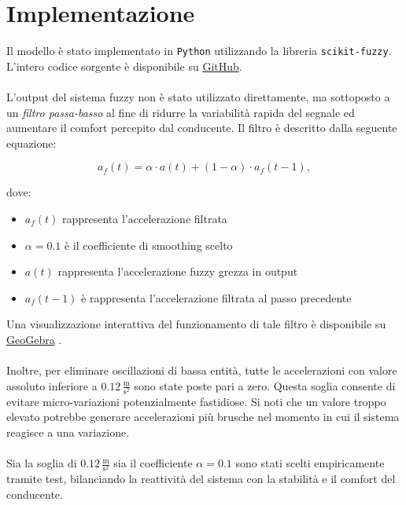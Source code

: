 \chapter{Implementazione}
\label{cha:implementazione}

Il modello è stato implementato in \texttt{Python} utilizzando la libreria \texttt{scikit-fuzzy}.  
L'intero codice sorgente è disponibile su \href{https://github.com/Leso246/FuzzyACC}{GitHub}.
\\\\
\noindent L'output del sistema fuzzy non è stato utilizzato direttamente, ma sottoposto a un \emph{filtro passa-basso} 
al fine di ridurre la variabilità rapida del segnale ed aumentare il comfort percepito dal conducente.  
Il filtro è descritto dalla seguente equazione:

\[
a_{f}(t) = \alpha \cdot a(t) + (1 - \alpha) \cdot a_{f}(t-1),
\]

\noindent dove:
\begin{itemize}
    \item $a_{f}(t)$ rappresenta l'accelerazione filtrata
    \item $\alpha = 0.1$ è il coefficiente di smoothing scelto
    \item $a(t)$ rappresenta l'accelerazione fuzzy grezza in output
    \item $a_{f}(t-1)$ è rappresenta l'accelerazione filtrata al passo precedente
\end{itemize}
Una visualizzazione interattiva del funzionamento di tale filtro è disponibile 
su \href{https://www.geogebra.org/m/tb88mqrm}{GeoGebra} \cite{geogebraEWMA}.
\\\\
\noindent Inoltre, per eliminare oscillazioni di bassa entità, tutte le accelerazioni con valore assoluto inferiore a $0.12 \, \frac{\mathrm{m}}{\mathrm{s^2}}$ 
sono state poste pari a zero.  
Questa soglia consente di evitare micro-variazioni potenzialmente fastidiose. Si noti che un valore troppo elevato potrebbe
generare accelerazioni più brusche nel momento in cui il sistema reagisce a una variazione.
\\\\
\noindent Sia la soglia di $0.12 \,\frac{\mathrm{m}}{\mathrm{s^2}}$ sia il coefficiente $\alpha = 0.1$ sono stati scelti empiricamente tramite test, 
bilanciando la reattività del sistema con la stabilità e il comfort del conducente.

